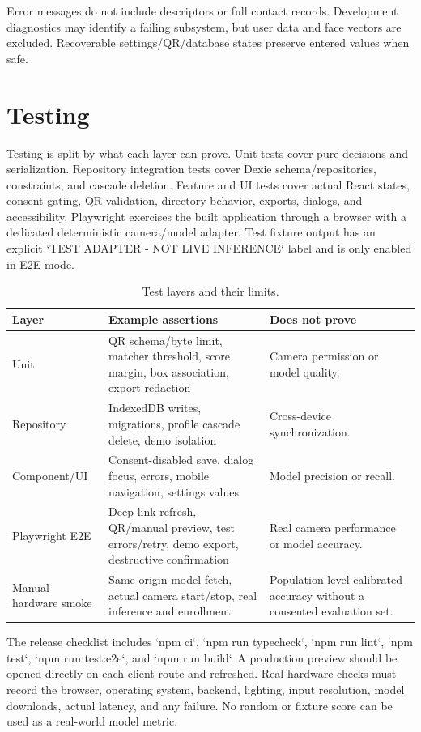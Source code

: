 \documentclass[11pt,oneside,openany]{report}
\begin{document}
Error messages do not include descriptors or full contact records. Development diagnostics may identify a failing subsystem, but user data and face vectors are excluded. Recoverable settings/QR/database states preserve entered values when safe.

\chapter{Testing}
Testing is split by what each layer can prove. Unit tests cover pure decisions and serialization. Repository integration tests cover Dexie schema/repositories, constraints, and cascade deletion. Feature and UI tests cover actual React states, consent gating, QR validation, directory behavior, exports, dialogs, and accessibility. Playwright exercises the built application through a browser with a dedicated deterministic camera/model adapter. Test fixture output has an explicit `TEST ADAPTER - NOT LIVE INFERENCE` label and is only enabled in E2E mode.

\begin{table}[htbp]
\centering
\caption{Test layers and their limits.}
\begin{tabularx}{\textwidth}{>{\raggedright\arraybackslash}p{}XX}
\toprule
\textbf{Layer} & \textbf{Example assertions} & \textbf{Does not prove} \\
\midrule
Unit & QR schema/byte limit, matcher threshold, score margin, box association, export redaction & Camera permission or model quality. \\
Repository & IndexedDB writes, migrations, profile cascade delete, demo isolation & Cross-device synchronization. \\
Component/UI & Consent-disabled save, dialog focus, errors, mobile navigation, settings values & Model precision or recall. \\
Playwright E2E & Deep-link refresh, QR/manual preview, test errors/retry, demo export, destructive confirmation & Real camera performance or model accuracy. \\
Manual hardware smoke & Same-origin model fetch, actual camera start/stop, real inference and enrollment & Population-level calibrated accuracy without a consented evaluation set. \\
\bottomrule
\end{tabularx}
\end{table}

The release checklist includes `npm ci`, `npm run typecheck`, `npm run lint`, `npm test`, `npm run test:e2e`, and `npm run build`. A production preview should be opened directly on each client route and refreshed. Real hardware checks must record the browser, operating system, backend, lighting, input resolution, model downloads, actual latency, and any failure. No random or fixture score can be used as a real-world model metric.
\end{document}
